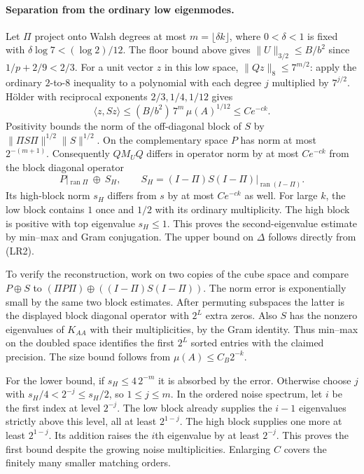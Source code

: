 \paragraph{Separation from the ordinary low eigenmodes.}
Let $\Pi$ project onto Walsh degrees at most $m=\lfloor\delta k\rfloor$,
where $0<\delta<1$ is fixed with $\delta\log 7<(\log 2)/12$.
The floor bound above gives $\|U\|_{3/2}\le B/b^2$ since
$1/p+2/9<2/3$. For a unit vector $z$ in this low space,
$\|Qz\|_8\le7^{m/2}$: apply the ordinary $2$-to-$8$ inequality
to a polynomial with each degree $j$ multiplied by $7^{j/2}$.
H\"older with reciprocal exponents $2/3,1/4,1/12$ gives
\[
 \langle z,Sz\rangle \le (B/b^2)\,7^m\,\mu(A)^{1/12}
 \le Ce^{-ck}.
\]
Positivity bounds the norm of the off-diagonal block of $S$ by
$\|\Pi S\Pi\|^{1/2}\|S\|^{1/2}$. On the complementary space $P$ has norm
at most $2^{-(m+1)}$. Consequently $QM_UQ$ differs in operator norm by
at most $Ce^{-ck}$ from the block diagonal operator
\[
 P|_{\operatorname{ran}\Pi}\ \oplus\
 S_H,\qquad S_H=(I-\Pi)S(I-\Pi)|_{\operatorname{ran}(I-\Pi)} .
\]
Its high-block norm $s_H$ differs from $s$ by at most $Ce^{-ck}$ as well.
For large $k$, the low block contains $1$ once and $1/2$ with its ordinary
multiplicity. The high block is positive with top eigenvalue $s_H\le1$.
This proves the second-eigenvalue estimate by min--max and Gram conjugation.
The upper bound on $\Delta$ follows directly from (LR2).

To verify the reconstruction, work on two copies of the cube space and
compare $P\oplus S$ to $(\Pi P\Pi)\oplus((I-\Pi)S(I-\Pi))$.
The norm error is exponentially small by the same two block estimates.
After permuting subspaces the latter is the displayed block diagonal
operator with $2^L$ extra zeros. Also $S$ has the nonzero eigenvalues of
$K_{AA}$ with their multiplicities, by the Gram identity. Thus min--max
on the doubled space identifies the first $2^L$ sorted entries with the
claimed precision. The size bound follows from $\mu(A)\le C_B2^{-k}$.

For the lower bound, if $s_H\le4\,2^{-m}$ it is absorbed by the error.
Otherwise choose $j$ with $s_H/4<2^{-j}\le s_H/2$, so $1\le j\le m$.
In the ordered noise spectrum, let $i$ be the first index at level $2^{-j}$.
The low block already supplies the $i-1$ eigenvalues strictly above this
level, all at least $2^{1-j}$. The high block supplies one more at least
$2^{1-j}$. Its addition raises the $i$th eigenvalue by at least $2^{-j}$.
This proves the first bound despite the growing noise multiplicities.
Enlarging $C$ covers the finitely many smaller matching orders.

